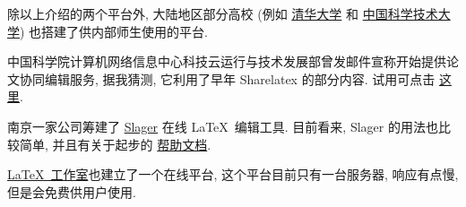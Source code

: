 除以上介绍的两个平台外,
大陆地区部分高校 (例如%
\href{https://overleaf.tsinghua.edu.cn/login}{清华大学}%
和%
\href{https://latex.ustc.edu.cn/login}{中国科学技术大学}) 也搭建了供内部师生使用的平台.

中国科学院计算机网络信息中心科技云运行与技术发展部曾发邮件宣称开始提供论文协同编辑服务,
据我猜测,
它利用了早年 Sharelatex 的部分内容.
试用可点击%
\href{https://www.cstcloud.cn/resources/452}{这里}.

南京一家公司筹建了
\href{https://www.slager.link/#/Home}{Slager} 在线 \LaTeX\ 编辑工具.
目前看来,
Slager 的用法也比较简单,
并且有关于起步的%
\href{https://www.slager.link/#/HelpCenter}{帮助文档}.

\href{https://online.latexstudio.net}{\LaTeX\ 工作室}也建立了一个在线平台,
这个平台目前只有一台服务器,
响应有点慢,
但是会免费供用户使用.
